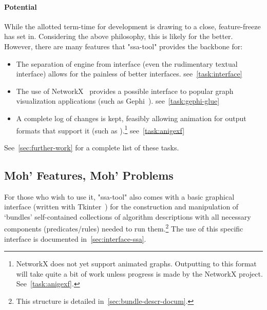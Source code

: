 \paragraph{Potential}
While the allotted term-time for development is drawing to a close,
  feature-freeze has set in.
Considering the above philosophy, this is likely for the better.
However, there are many features that "ssa-tool" provides the backbone for:
\begin{itemize}
\providecommand\TaskRef[1]{\hfill\mbox{see~\autoref{task:#1}}}
\item The separation of engine from interface (even the rudimentary textual interface)
  allows for the painless of better interfaces.
  \TaskRef{interface}
\item The use of NetworkX~\autocite{hagberg:networkx} provides a possible
  interface to popular graph visualization applications (such as Gephi~\autocite{gephi}).
  \TaskRef{gephi-glue}
\item A complete log of changes is kept, feasibly allowing animation for
  output formats that support it (such as ).\footnote{%
    NetworkX does not yet support animated graphs.
    Outputting to this format will take quite a bit of work
      unless progress is made by the NetworkX project.
    See~\autoref{task:anigexf}.}
  \TaskRef{anigexf}
\end{itemize}
See~\autoref{sec:further-work} for a complete list of these tasks.

\subsection{Moh' Features, Moh' Problems}
For those who wish to use it,
  "ssa-tool" also comes with a basic graphical interface (written with Tkinter~\autocite{tkinter})
  for the construction and manipulation of \enquote*{bundles} \Dash
  self-contained collections of algorithm descriptions
  with all necessary components (predicates\slash rules)
  needed to run them.\footnote{This structure is detailed in~\autoref{sec:bundle-descr-docum}.}
The use of this specific interface is documented in~\autoref{sec:interface-ssa}.

